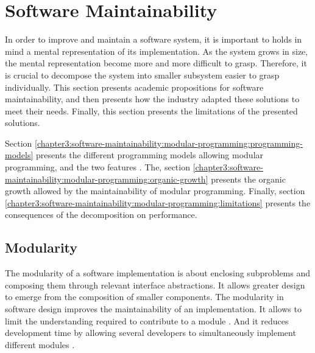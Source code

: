 \section{Software Maintainability} \label{chapter3:software-maintainability}



In order to improve and maintain a software system, it is important to holds in mind a mental representation of its implementation.
As the system grows in size, the mental representation become more and more difficult to grasp.
Therefore, it is crucial to decompose the system into smaller subsystem easier to grasp individually.
This section presents academic propositions for software maintainability, and then presents how the industry adapted these solutions to meet their needs.
Finally, this section presents the limitations of the presented solutions.



Section \ref{chapter3:software-maintainability:modular-programming:programming-models} presents the different programming models allowing modular programming, and the two features .
The, section \ref{chapter3:software-maintainability:modular-programming:organic-growth} presents the organic growth allowed by the maintainability of modular programming.
Finally, section \ref{chapter3:software-maintainability:modular-programming:limitations} presents the consequences of the decomposition on performance.


\subsection{Modularity} \label{chapter3:software-maintainability:modularity}

The modularity of a software implementation is about enclosing subproblems and composing them through relevant interface abstractions.
It allows greater design to emerge from the composition of smaller components.
The modularity in software design improves the maintainability of an implementation.
It allows to limit the understanding required to contribute to a module \cite{Stevens1974}.
And it reduces development time by allowing several developers to simultaneously implement different modules \cite{Wong2009,Cataldo2006}.

